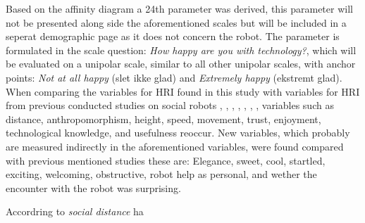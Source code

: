 \noindent
%
Based on the affinity diagram a 24th parameter was derived, this parameter will not be presented along side the aforementioned scales but will be included in a seperat demographic page as it does not concern the robot. The parameter is formulated in the scale question: \textit{How happy are you with technology?}, which will be evaluated on a unipolar scale, similar to all other unipolar scales, with anchor points: \textit{Not at all happy} (slet ikke glad) and \textit{Extremely happy} (ekstremt glad).\\  

\noindent
When comparing the variables for HRI found in this study with variables for HRI from previous conducted studies on social robots \cite{PDF:ExploringInfluencingVariable}, \cite{PDF:SharingALifeHarvey}, \cite{PDF:InTheCompanyofRobots}, \cite{PDF:CloseButNotStuck}, \cite{PDF:TheImpactOfTraveler}, \cite{PDF:HumanRobotEmodiedInteraction}, \cite{PDF:RecommendationEffects}, variables such as distance, anthropomorphism, height, speed, movement, trust, enjoyment, technological knowledge, and usefulness reoccur. New variables, which probably are measured indirectly in the aforementioned variables, were found compared with previous mentioned studies these are: Elegance, sweet, cool, startled, exciting, welcoming, obstructive, robot help as personal, and wether the encounter with the robot was surprising. 

Accordring to \cite{PDF:HowSocialDistanceShapesHRI} \textit{social distance} ha
 
  




